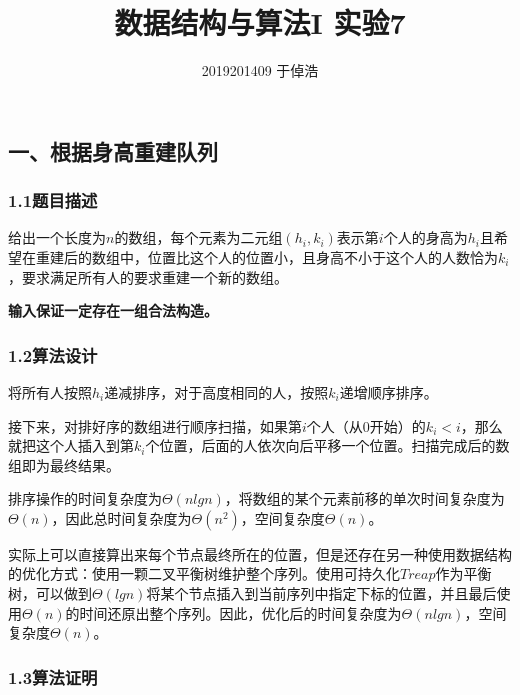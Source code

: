 \documentclass[]{article}
\title{数据结构与算法I 实验7}
\author{2019201409 于倬浩}
\begin{document}
\maketitle

\tableofcontents

\hypertarget{header-n41}{%
\subsection{一、根据身高重建队列}\label{header-n41}}

\hypertarget{header-n42}{%
\subsubsection{1.1题目描述}\label{header-n42}}

给出一个长度为\(n\)的数组，每个元素为二元组\((h_i, k_i)\)表示第\(i\)个人的身高为\(h_i\)且希望在重建后的数组中，位置比这个人的位置小，且身高不小于这个人的人数恰为\(k_i\)，要求满足所有人的要求重建一个新的数组。

\textbf{输入保证一定存在一组合法构造。}

\hypertarget{header-n45}{%
\subsubsection{1.2算法设计}\label{header-n45}}

将所有人按照\(h_i\)递减排序，对于高度相同的人，按照\(k_i\)递增顺序排序。

接下来，对排好序的数组进行顺序扫描，如果第\(i\)个人（从0开始）的\(k_i < i\)，那么就把这个人插入到第\(k_i\)个位置，后面的人依次向后平移一个位置。扫描完成后的数组即为最终结果。

排序操作的时间复杂度为\(\Theta(nlgn)\)，将数组的某个元素前移的单次时间复杂度为\(\Theta(n)\)，因此总时间复杂度为\(\Theta(n^2)\)，空间复杂度\(\Theta(n)\)。

实际上可以直接算出来每个节点最终所在的位置，但是还存在另一种使用数据结构的优化方式：使用一颗二叉平衡树维护整个序列。使用可持久化\(Treap\)作为平衡树，可以做到\(\Theta(lgn)\)将某个节点插入到当前序列中指定下标的位置，并且最后使用\(\Theta(n)\)的时间还原出整个序列。因此，优化后的时间复杂度为\(\Theta(nlgn)\)，空间复杂度\(\Theta(n)\)。

\hypertarget{header-n50}{%
\subsubsection{1.3算法证明}\label{header-n50}}
\end{document}

